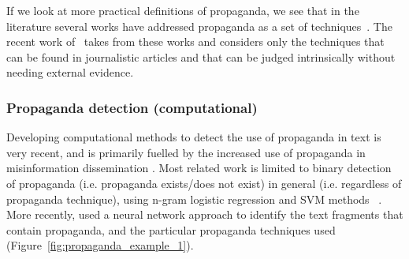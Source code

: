 If we look at more practical definitions of propaganda, we see that in the literature several works have addressed propaganda as a set of techniques~\citep{torok2015symbiotic,miller1939techniques,weston2018rulebook}. The recent work of~\citet{da2019fine} takes from these works and considers only the techniques that can be found in journalistic articles and that can be judged intrinsically without needing external evidence.



\subsubsection{Propaganda detection (computational)}
\label{ssec:lit_propaganda_detection}




Developing computational methods to detect the use of propaganda in text is very recent, and is primarily fuelled by the increased use of propaganda in misinformation dissemination \citep{da2020survey}. Most related work is limited to binary detection of propaganda (i.e. propaganda exists/does not exist) in general (i.e. regardless of propaganda technique), using n-gram logistic regression and SVM methods ~\citep{rashkin2017truth,barron2019proppy}. More recently, \citet{da2019fine} used a neural network approach to identify the text fragments that contain propaganda, and the particular propaganda techniques used (Figure~\ref{fig:propaganda_example_1}).




